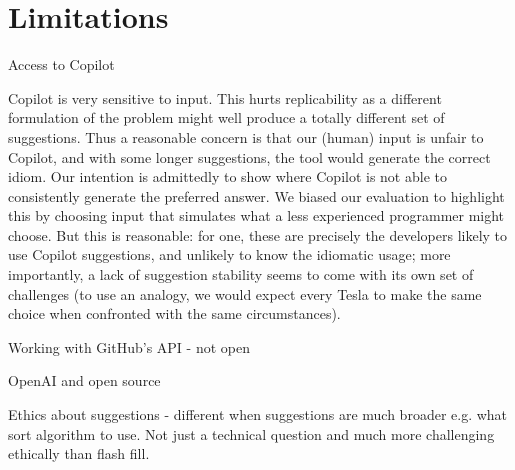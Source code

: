 \section{Limitations}
Access to Copilot

Copilot is very sensitive to input. This hurts replicability as a different formulation of the problem might well produce a totally different set of suggestions. 
Thus a reasonable concern is that our (human) input is unfair to Copilot, and with some longer suggestions, the tool would generate the correct idiom. 
Our intention is admittedly to show where Copilot is not able to consistently generate the preferred answer. We biased our evaluation to highlight this by choosing input that simulates what a less experienced programmer might choose. But this is reasonable: for one, these are precisely the developers likely to use Copilot suggestions, and unlikely to know the idiomatic usage; more importantly, a lack of suggestion stability seems to come with its own set of challenges (to use an analogy, we would expect every Tesla to make the same choice when confronted with the same circumstances). %

Working with GitHub's API - not open

OpenAI and open source

Ethics about suggestions - different when suggestions are much broader e.g. what sort algorithm to use. Not just a technical question and much more challenging ethically than flash fill. 
